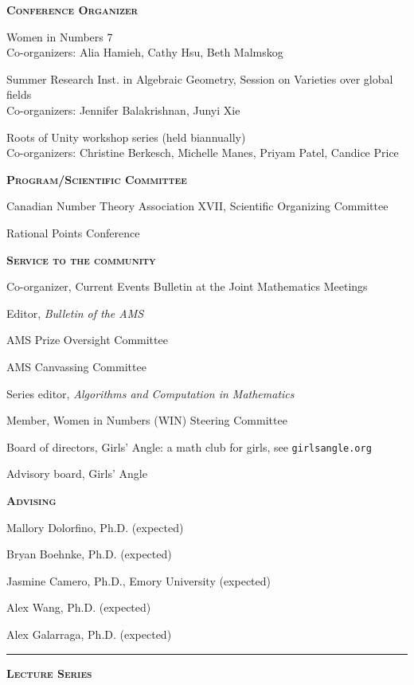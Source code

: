 \documentclass[12pt]{article}
\newcommand{\sectionheading}[1]
	{\bigskip %
	\noindent
	\hspace{-6.5mm}\textcolor{Gray}{\rule[.75mm]{21.5mm}{1mm}} %
	\hspace{.2mm}	%
	{\large{\textbf{\textsc{#1}}}} %
}
\newenvironment{date_section}
	{
	\vspace{-1ex}
	\leftmargini = 15ex
	 \begin{itemize}[
		 labelsep = *,
		 labelwidth = 9ex,
		 labelindent = 0ex,
		 itemindent = !,
		 font=\normalfont, 
		 align=parleft
		 ]
		{}
		\itemsep=-1.5mm}
	{\end{itemize}\vspace{-2ex}}
\newcommand{\yearmo}[2]{
	\item[ 
		{\makebox[1ex][r]{#1}}
		\hspace{1ex}
		{\makebox[1ex][l]{#2} }
		] }
\newcommand{\yearrange}[2]{
	\item[ 
		{\makebox[1ex][r]{#1}}
		--
		{\makebox[1ex][l]{#2} }
		] }
\begin{document}
		\begin{date_section}
			
			\yearmo{}{}\textbf{\textsc{Conference Organizer}}
			\yearmo{}{2026} Women in Numbers 7\\
			Co-organizers: Alia Hamieh, Cathy Hsu, Beth Malmskog
			\yearmo{}{2025} Summer Research Inst. in Algebraic Geometry,  Session on Varieties over global fields\\
			Co-organizers: Jennifer Balakrishnan, Junyi Xie
            \yearrange{2022}{}
            Roots of Unity workshop series (held biannually)\\
            Co-organizers: Christine Berkesch, Michelle Manes, Priyam Patel,  Candice Price
			\yearmo{}{}\textbf{\textsc{Program/Scientific Committee}}
			\yearmo{}{2027} Canadian Number Theory Association XVII, Scientific Organizing Committee
            \yearrange{2022}{} Rational Points Conference
			\yearmo{}{}\textbf{\textsc{Service to the community}}
			\yearrange{2025}{} Co-organizer, Current Events Bulletin at the Joint Mathematics Meetings
			\yearrange{2024}{} Editor, \textit{Bulletin of the AMS}
			\yearrange{2024}{2027} AMS Prize Oversight Committee
			\yearrange{2024}{2026} AMS Canvassing Committee




	\yearrange{2018}{} Series editor, \textit{Algorithms and Computation in Mathematics}

	\yearrange{2015}{}
	Member, Women in Numbers (WIN) Steering Committee

	\yearrange{2012}{}
	Board of directors, Girls' Angle: a math club for girls, see \texttt{girlsangle.org}

\yearrange{2011}{}
	Advisory board, Girls' Angle


	\yearmo{}{}\textbf{\textsc{Advising}}
	\yearmo{}{}Mallory Dolorfino, Ph.D. (expected)
	\yearmo{}{}Bryan Boehnke, Ph.D. (expected)
	\yearmo{}{}Jasmine Camero, Ph.D., Emory University (expected)
	\yearmo{}{}Alex Wang, Ph.D. (expected)
	\yearmo{}{} Alex Galarraga, Ph.D. (expected)
		\end{date_section}



		

	\sectionheading{Lecture Series}%
\end{document}
